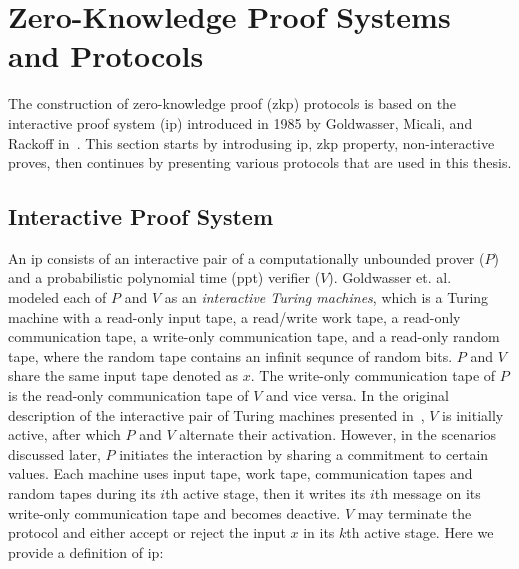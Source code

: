 \section{Zero-Knowledge Proof Systems and Protocols}

The construction of zero-knowledge proof (\gls{zkp}) protocols is based on the interactive proof system (\gls{ip}) introduced in 1985 by Goldwasser, Micali, and Rackoff in~\cite{Goldwasser1985}.  This section starts by introdusing \gls{ip}, \gls{zkp} property, non-interactive proves, then continues by presenting various  protocols that are used in this thesis. 

\subsection{Interactive Proof System}\label{sec:Prel_IP}

 An \gls{ip} consists of  an interactive pair of a computationally unbounded prover ($P$) and a probabilistic polynomial time (\gls{ppt})  verifier ($V$).  Goldwasser et. al.~\cite{Goldwasser1985} modeled each of $P$ and $V$ as an \textit{interactive Turing machines}, which is a Turing machine with a read-only input tape, a read/write work tape, a read-only communication tape, a write-only communication tape, and a read-only random tape, where the random tape contains an infinit sequnce of random bits. $P$  and $V$ share the same input tape denoted as $x$. The write-only communication tape of $P$ is the read-only communication tape of $V$ and vice versa. In the original description of the interactive pair of Turing machines presented in~\cite{Goldwasser1985}, $V$ is initially active, after which $P$ and $V$ alternate their activation. However, in the scenarios discussed later, $P$ initiates the interaction by sharing a commitment to certain values. Each machine uses input tape, work tape, communication tapes and random tapes during its $i$th active stage, then it writes its $i$th message on its write-only communication tape and becomes deactive. $V$ may terminate the protocol and either accept or reject the input $x$ in its $k$th active stage. Here we provide a definition of \gls{ip}:
  
